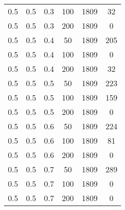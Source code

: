 \begin{table}[h]
\begin{center}
\begin{tabular}{|c|c|c|c|c|c|}
		0.5 &  0.5 &  0.3 &  100 &  1809 &    32 \\
		0.5 &  0.5 &  0.3 &  200 &  1809 &     0 \\
	   \hline
		0.5 &  0.5 &  0.4 &   50 &  1809 &   205 \\
		0.5 &  0.5 &  0.4 &  100 &  1809 &     0 \\
		0.5 &  0.5 &  0.4 &  200 &  1809 &    32 \\
	   \hline
		0.5 &  0.5 &  0.5 &   50 &  1809 &   223 \\
		0.5 &  0.5 &  0.5 &  100 &  1809 &   159 \\
		0.5 &  0.5 &  0.5 &  200 &  1809 &     0 \\
	   \hline
		0.5 &  0.5 &  0.6 &   50 &  1809 &   224 \\
		0.5 &  0.5 &  0.6 &  100 &  1809 &    81 \\
		0.5 &  0.5 &  0.6 &  200 &  1809 &     0 \\
	   \hline
		0.5 &  0.5 &  0.7 &   50 &  1809 &   289 \\
		0.5 &  0.5 &  0.7 &  100 &  1809 &     0 \\
		0.5 &  0.5 &  0.7 &  200 &  1809 &     0 \\
	   \hline
        		\end{tabular}
	\end{center}
\end{table}
